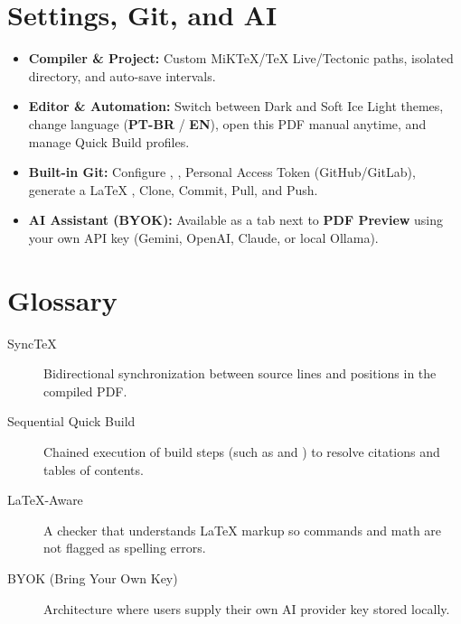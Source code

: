 \documentclass[11pt,a4paper]{article}
\begin{document}
\section{Settings, Git, and AI}
\begin{itemize}
  \item \textbf{Compiler \& Project:} Custom MiKTeX/TeX Live/Tectonic paths, isolated  directory, and auto-save intervals.
  \item \textbf{Editor \& Automation:} Switch between Dark and Soft Ice Light themes, change language (\textbf{PT-BR} / \textbf{EN}), open this PDF manual anytime, and manage Quick Build profiles.
  \item \textbf{Built-in Git:} Configure , , Personal Access Token (GitHub/GitLab), generate a \LaTeX{} , Clone, Commit, Pull, and Push.
  \item \textbf{AI Assistant (BYOK):} Available as a tab next to \textbf{PDF Preview} using your own API key (Gemini, OpenAI, Claude, or local Ollama).
\end{itemize}

\section{Glossary}
\begin{description}
  \item[SyncTeX] Bidirectional synchronization between  source lines and positions in the compiled PDF.
  \item[Sequential Quick Build] Chained execution of build steps (such as  and ) to resolve citations and tables of contents.
  \item[LaTeX-Aware] A checker that understands \LaTeX{} markup so commands and math are not flagged as spelling errors.
  \item[BYOK (Bring Your Own Key)] Architecture where users supply their own AI provider key stored locally.
\end{description}
\end{document}
